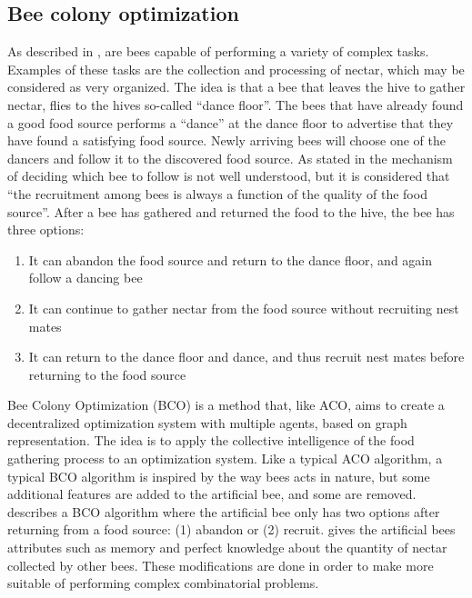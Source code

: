 \subsection{Bee colony optimization}
\label{subsec:BCO}
As described in \citet{lucic03}, are bees capable of performing a variety of complex tasks. Examples of these tasks are the collection and processing of nectar, which may be considered as very organized. The idea is that a bee that leaves the hive to gather nectar, flies to the hives so-called ``dance floor''. The bees that have already found a good food source performs a ``dance'' at the dance floor to advertise that they have found a satisfying food source. Newly arriving bees will choose one of the dancers and follow it to the discovered food source. As stated in \citet{lucic03} the mechanism of deciding which bee to follow is not well understood, but it is considered that ``the recruitment among bees is always a function of the quality of the food source''. After a bee has gathered and returned the food to the hive, the bee has three options\citep{lucic03}:

\begin{enumerate}
  \item It can abandon the food source and return to the dance floor, and again follow a dancing bee
  \item It can continue to gather nectar from the food source without recruiting nest mates
  \item It can return to the dance floor and dance, and thus recruit nest mates before returning to the food source
\end{enumerate}

Bee Colony Optimization (BCO) is a method that, like ACO, aims to create a decentralized optimization system with multiple agents, based on graph representation. The idea is to apply the collective intelligence of the food gathering process to an optimization system. Like a typical ACO algorithm, a typical BCO algorithm is inspired by the way bees acts in nature, but some additional features are added to the artificial bee, and some are removed. \citet{nikolic14} describes a BCO algorithm where the artificial bee only has two options after returning from a food source: (1) abandon or (2) recruit. \citet{lucic03} gives the artificial bees attributes such as memory and perfect knowledge about the quantity of nectar collected by other bees. These modifications are done in order to make more suitable of performing complex combinatorial problems.

